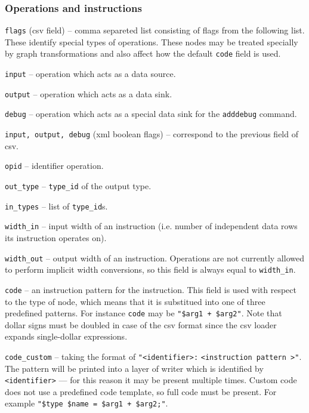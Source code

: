 \subsubsection{Operations and instructions}
  \begin{description}
  \item \texttt{flags} (csv field) -- comma separeted list consisting of flags from the following list. These identify special types of operations. These nodes may be treated specially by graph transformations and also affect how the default \texttt{code} field is used.
  \begin{description}
	\item \texttt{input} -- operation which acts as a data source. 
	\item \texttt{output} -- operation which acts as a data sink.
	\item \texttt{debug} -- operation which acts as a special data sink for the \texttt{adddebug} command.
  \end{description}
  \item \texttt{input, output, debug} (xml boolean flags) -- correspond to the previous field of csv.
  \item\texttt{opid} -- identifier operation.
  \item\texttt{out\_type} -- \texttt{type\_id} of the output type.
  \item\texttt{in\_types} -- list of \texttt{type\_id}s.
\item\texttt{width\_in} -- input width of an instruction (i.e. number of independent data rows its instruction operates on).
  \item\texttt{width\_out} -- output width of an instruction. Operations are not currently allowed to perform implicit width conversions, so this field is always equal to \texttt{width\_in}.
  \item\texttt{code} -- an instruction pattern for the instruction. This field is used with respect to the type of node, which means that it is substitued into one of three predefined patterns. For instance \texttt{code} may be \texttt{"\$arg1 + \$arg2"}. Note that dollar signs must be doubled in case of the csv format since the csv loader expands single-dollar expressions.
  \item\texttt{code\_custom} -- taking the format of \texttt{"\textless identifier\textgreater:} \texttt{\textless instruction pattern \textgreater"}. The pattern will be printed into a layer of writer which is identified by \texttt{<identifier>} --- for this reason it may be present multiple times. Custom code does not use a predefined code template, so full code must be present. For example \texttt{"\$type \$name = \$arg1 + \$arg2;"}.
\end{description}


